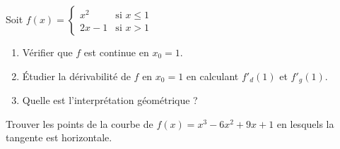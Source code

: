 \begin{exercice}
  Soit $f(x) = \begin{cases} x^2 & \text{si } x \leq 1 \\ 2x-1 & \text{si } x > 1 \end{cases}$

  \medskip
  \begin{enumerate}
    \item V\'{e}rifier que $f$ est continue en $x_0 = 1$.
    \item \'{E}tudier la d\'{e}rivabilit\'{e} de $f$ en $x_0 = 1$
          en calculant $f'_d(1)$ et $f'_g(1)$.
    \item Quelle est l'interpr\'{e}tation g\'{e}om\'{e}trique ?
  \end{enumerate}
\end{exercice}

\begin{exercice}
  Trouver les points de la courbe de $f(x) = x^3 - 6x^2 + 9x + 1$
  en lesquels la tangente est horizontale.
\end{exercice}